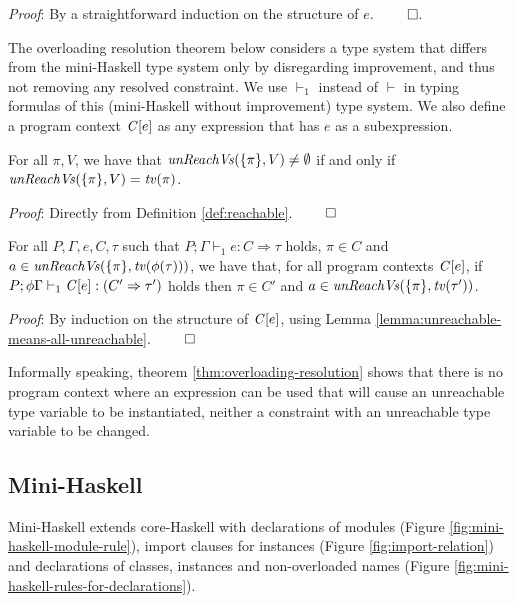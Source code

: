 {\em Proof\/}: By a straightforward induction on the structure of $e$. $\qed$.

The overloading resolution theorem below considers a type system that
differs from the mini-Haskell type system only by disregarding
improvement, and thus not removing any resolved constraint. We use
$\vdash_1$ instead of $\vdash$ in typing formulas of this
(mini-Haskell without improvement) type system. We also define a
program context $\mathit{C\/}[e]$ as any expression that has $e$ as a
subexpression.

\begin{Lemma}
  \label{lemma:unreachable-means-all-unreachable}
  For all $\pi, V$, we have that $\text{\it unReachVs\/}(\{\pi\},V)\not=\emptyset$
  if and only if $\text{\it unReachVs\/}(\{\pi\},V)={\it tv\/}(\pi)$.
\end{Lemma}

{\em Proof\/}: Directly from Definition \ref{def:reachable}. $\qed$

\begin{Theorem}
  For all $P, \Gamma, e, C, \tau$ such that $P;\Gamma \vdash_1 e:
  C\Rightarrow \tau$ holds, $\pi\in C$ and
  $a\in\text{\it unReachVs\/}(\{\pi\},{\it tv\/}(\phi(\tau)))$, we have that, for
  all program contexts $\mathit{C\/}[e]$, if $P;\phi\Gamma \vdash_1 \mathit{C\/}[e]:
  (C'\Rightarrow \tau')$ holds then $\pi \in C'$ and $a\in
  \text{\it unReachVs\/}(\{\pi\},{\it tv\/}(\tau'))$.
\label{thm:overloading-resolution}
\end{Theorem}

{\em Proof\/}: By induction on the structure of $\mathit{C\/}[e]$, using Lemma
\ref{lemma:unreachable-means-all-unreachable}. $\qed$

Informally speaking, theorem \ref{thm:overloading-resolution} shows
that there is no program context where an expression can be used that
will cause an unreachable type variable to be instantiated, neither a
constraint with an unreachable type variable to be changed.

\subsection{Mini-Haskell}
\label{sec:mini-Haskell}

Mini-Haskell extends core-Haskell with declarations of modules (Figure
\ref{fig:mini-haskell-module-rule}), import clauses for instances
(Figure \ref{fig:import-relation}) and declarations of classes,
instances and non-overloaded names (Figure
\ref{fig:mini-haskell-rules-for-declarations}).

